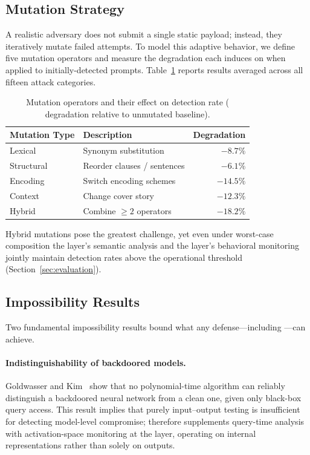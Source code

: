 \subsection{Mutation Strategy}

A realistic adversary does not submit a single static payload; instead, they
iteratively mutate failed attempts.  To model this adaptive behavior, we
define five mutation operators and measure the \pasr{} degradation each
induces on \sentinel{} when applied to initially-detected prompts.
Table~\ref{tab:mutations} reports results averaged across all fifteen attack
categories.

\begin{table}[t]
\centering
\caption{Mutation operators and their effect on \sentinel{} detection rate
         (\pasr{} degradation relative to unmutated baseline).}
\label{tab:mutations}
\small
\begin{tabular}{@{}llr@{}}
\toprule
\textbf{Mutation Type} & \textbf{Description} & \textbf{Degradation} \\
\midrule
Lexical      & Synonym substitution        & $-8.7\%$  \\
Structural   & Reorder clauses / sentences & $-6.1\%$  \\
Encoding     & Switch encoding schemes     & $-14.5\%$ \\
Context      & Change cover story          & $-12.3\%$ \\
Hybrid       & Combine $\geq 2$ operators  & $-18.2\%$ \\
\bottomrule
\end{tabular}
\end{table}

\noindent
Hybrid mutations pose the greatest challenge, yet even under worst-case
composition the \mire{} layer's semantic analysis and the \tsa{} layer's
behavioral monitoring jointly maintain detection rates above the operational
threshold (Section~\ref{sec:evaluation}).

\subsection{Impossibility Results}

Two fundamental impossibility results bound what any defense---including
\sentinel{}---can achieve.

\paragraph{Indistinguishability of backdoored models.}
Goldwasser and Kim~\cite{goldwasser2022} show that no polynomial-time
algorithm can reliably distinguish a backdoored neural network from a clean
one, given only black-box query access.  This result implies that purely
input--output testing is insufficient for detecting model-level compromise;
\sentinel{} therefore supplements query-time analysis with activation-space
monitoring at the \tsa{} layer, operating on internal representations rather
than solely on outputs.

